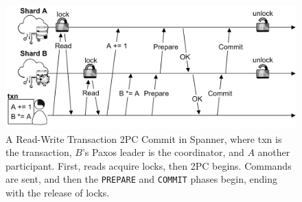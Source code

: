 \begin{figure}[ht!]
    \centering
    \includegraphics[width=\textwidth]{Sections/span/rw.png}
    \caption{A Read-Write Transaction 2PC Commit in Spanner, where txn is the transaction, $B$'s Paxos leader is the coordinator, and $A$ another participant. First, reads acquire locks, then 2PC begins.
    Commands are sent, and then the \texttt{PREPARE} and \texttt{COMMIT} phases begin, ending with the release of locks.}

\end{figure}

